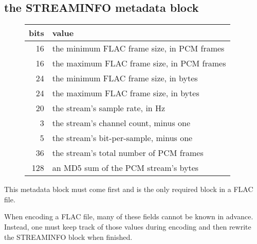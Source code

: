 \subsection{the STREAMINFO metadata block}
\begin{figure}[h]
\begin{tabular}{|r|l|}
\hline
bits & value \\
\hline
16 & the minimum FLAC frame size, in PCM frames \\
16 & the maximum FLAC frame size, in PCM frames \\
24 & the minimum FLAC frame size, in bytes \\
24 & the maximum FLAC frame size, in bytes \\
20 & the stream's sample rate, in Hz \\
3 & the stream's channel count, minus one \\
5 & the stream's bit-per-sample, minus one \\
36 & the stream's total number of PCM frames \\
128 & an MD5 sum of the PCM stream's bytes \\
\hline
\end{tabular}
\end{figure}
\par
\noindent
This metadata block must come first and is the only required block
in a FLAC file.

When encoding a FLAC file, many of these fields cannot be known in advance.
Instead, one must keep track of those values during encoding and then
rewrite the STREAMINFO block when finished.

